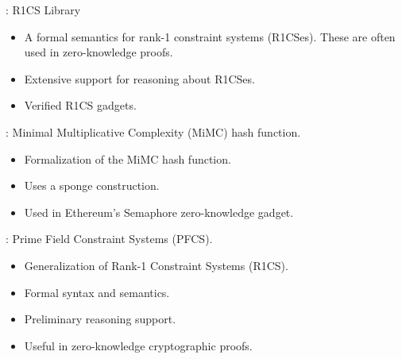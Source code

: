 
\begin{frame}

\newlibtitle

: R1CS Library

\begin{itemize}

\item A formal semantics for rank-1 constraint systems (R1CSes). These
  are often used in zero-knowledge proofs.

\item Extensive support for reasoning about R1CSes.

\item Verified R1CS gadgets.

\end{itemize}

\end{frame}


\begin{frame}

\newlibtitle

:
Minimal Multiplicative Complexity (MiMC) hash function.
\begin{itemize}
\item Formalization of the MiMC hash function.
\item Uses a sponge construction.
\item Used in Ethereum's Semaphore zero-knowledge gadget.
\end{itemize}

\end{frame}


\begin{frame}

\newlibtitle

:
Prime Field Constraint Systems (PFCS).
\begin{itemize}
\item Generalization of Rank-1 Constraint Systems (R1CS).
\item Formal syntax and semantics.
\item Preliminary reasoning support.
\item Useful in zero-knowledge cryptographic proofs.
\end{itemize}

\end{frame}

